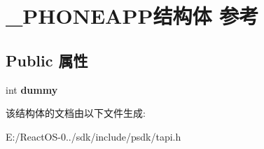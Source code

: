 \hypertarget{struct___p_h_o_n_e_a_p_p}{}\section{\+\_\+\+P\+H\+O\+N\+E\+A\+P\+P结构体 参考}
\label{struct___p_h_o_n_e_a_p_p}
\subsection*{Public 属性}
\begin{DoxyCompactItemize}
\item 
\mbox{\label{struct___p_h_o_n_e_a_p_p_a2a343ffc224a24f3f3249b054e386c32}} 
int {\bfseries dummy}
\end{DoxyCompactItemize}


该结构体的文档由以下文件生成\+:\begin{DoxyCompactItemize}
\item 
E\+:/\+React\+O\+S-\/0../sdk/include/psdk/tapi.\+h\end{DoxyCompactItemize}
